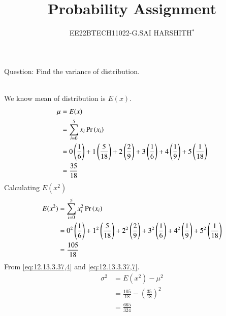 \documentclass[journal,12pt,twocolumn]{IEEEtran}
\theoremstyle{remark}
\begin{document}

\vspace{3cm}

\title{Probability Assignment}
\author{EE22BTECH11022-G.SAI HARSHITH$^{*}$%
}
\maketitle
\newpage
\bigskip
\renewcommand{\thefigure}{\theenumi}
\renewcommand{\thetable}{\theenumi}

Question: Find the variance of distribution.
\begin{table}[!ht]
	
\end{table}\\
\solution
We know mean of distribution is $E(x)$.
\begin{align}
\mu&=E(x)\\
&=\sum_{i=0}^{5} x_i\Pr\left(x_i\right)\\
&=0\left(\frac{1}{6}\right)+1\left(\frac{5}{18}\right)+2\left(\frac{2}{9}\right)+3\left(\frac{1}{6}\right)+4\left(\frac{1}{9}\right)+5\left(\frac{1}{18}\right)\\
&=\frac{35}{18}
\label{eq:12.13.3.37,4}
\end{align}
Calculating $E(x^2)$
\begin{align}
E(x^2)&=\sum_{i=0}^{5} x_i^2\Pr\left(x_i\right)\\
&=0^2\left(\frac{1}{6}\right)+1^2\left(\frac{5}{18}\right)+2^2\left(\frac{2}{9}\right)+3^2\left(\frac{1}{6}\right)+4^2\left(\frac{1}{9}\right)+5^2\left(\frac{1}{18}\right)\\
&=\frac{105}{18}
\label{eq:12.13.3.37,7}
\end{align}
From \eqref{eq:12.13.3.37,4} and \eqref{eq:12.13.3.37,7}.
\begin{align}
\sigma^2&=E(x^2)-\mu^2\\
&=\frac{105}{18}-\left(\frac{35}{18}\right)^2\\
&=\frac{665}{324}
\end{align}
\end{document}
